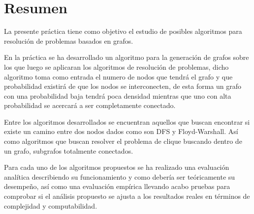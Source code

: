 \part{Resumen}

La presente práctica tiene como objetivo el estudio de posibles algoritmos para resolución de problemas basados en grafos.

En la práctica se ha desarrollado un algoritmo para la generación de grafos sobre los que luego se aplicaran los algoritmos de resolución de problemas, dicho algoritmo toma como entrada el numero de nodos que tendrá el grafo y que probabilidad existirá de que los nodos se interconecten, de esta forma un grafo con una probabilidad baja tendrá poca densidad mientras que uno con alta probabilidad se acercará a ser completamente conectado.

Entre los algoritmos desarrollados se encuentran aquellos que buscan encontrar si existe un camino entre dos nodos dados como son DFS y Floyd-Warshall. 
Así como algoritmos que buscan resolver el problema de clique buscando dentro de un grafo, subgrafos totalmente conectados.

Para cada uno de los algoritmos propuestos se ha realizado una evaluación analítica describiendo su funcionamiento y como debería ser teóricamente su desempeño, así como una evaluación empírica llevando acabo pruebas para comprobar si el análisis propuesto se ajusta a los resultados reales en términos de complejidad y computabilidad.
